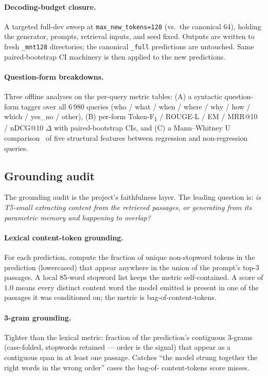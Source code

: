 \documentclass[11pt,a4paper]{article}
\makeatletter
\newcommand{\fdev}{6\,980}
\newcommand{\F}{F\textsubscript{1}}
\newcommand{\Tokenf}{Token-\F}
\newcommand{\rougel}{ROUGE-L}
\newcommand{\mrr}{MRR@10}
\newcommand{\ndcg}{nDCG@10}
\makeatother
\begin{document}
\paragraph{Decoding-budget closure.}  A targeted full-dev sweep at
\texttt{max\_new\_tokens=128} (vs.\ the canonical 64), holding the
generator, prompts, retrieval inputs, and seed fixed.  Outputs are
written to fresh \texttt{\_mnt128} directories; the canonical
\texttt{\_full} predictions are untouched.  Same paired-bootstrap CI
machinery is then applied to the new predictions.

\paragraph{Question-form breakdowns.}  Three offline analyses on the
per-query metric tables: (A) a syntactic question-form tagger over
all \fdev{} queries (who / what / when / where / why / how / which
/ yes\_no / other), (B) per-form \Tokenf{} / \rougel{} / EM /
\mrr{} / \ndcg{} $\Delta$ with paired-bootstrap CIs, and (C) a
Mann--Whitney U comparison~\cite{mannwhitney1947} of five structural
features between regression and non-regression queries.

\subsection{Grounding audit}
\label{sec:w7-method}

The grounding audit is the project's faithfulness layer.  The leading question is:
\emph{is T5-small extracting content from the retrieved passages, or
generating from its parametric memory and happening to overlap?}

\paragraph{Lexical content-token grounding.}  For each prediction,
compute the fraction of unique non-stopword tokens in the prediction
(lowercased) that appear anywhere in the union of the prompt's
top-3 passages.  A local 85-word stopword list keeps the metric
self-contained.  A score of $1.0$ means every distinct content word
the model emitted is present in one of the passages it was
conditioned on; the metric is bag-of-content-tokens.

\paragraph{3-gram grounding.}  Tighter than the lexical metric:
fraction of the prediction's contiguous 3-grams (case-folded,
stopwords retained --- order is the signal) that appear as a
contiguous span in at least one passage.  Catches ``the model strung
together the right words in the wrong order'' cases the bag-of-
content-tokens score misses.
\end{document}
